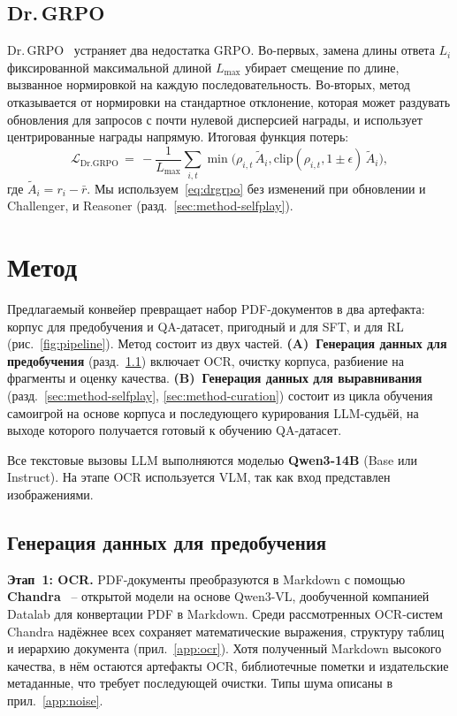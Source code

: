 \documentclass{article}
\begin{document}
\subsection{Dr.\,GRPO}

Dr.\,GRPO~\cite{liu2025drgrpo} устраняет два недостатка GRPO. Во-первых, замена длины ответа $L_i$ фиксированной максимальной длиной $L_{\max}$ убирает смещение по длине, вызванное нормировкой на каждую последовательность. Во-вторых, метод отказывается от нормировки на стандартное отклонение, которая может раздувать обновления для запросов с почти нулевой дисперсией награды, и использует центрированные награды напрямую. Итоговая функция потерь:
\begin{equation}
  \mathcal{L}_{\text{Dr.GRPO}} \,=\, -\frac{1}{L_{\max}}\!\sum_{i,t}
    \min\!\bigl(\rho_{i,t}\,\tilde A_i,
      \mathrm{clip}(\rho_{i,t}, 1\!\pm\!\epsilon)\,\tilde A_i\bigr),
  \label{eq:drgrpo}
\end{equation}
где $\tilde A_i = r_i - \bar r$. Мы используем~\eqref{eq:drgrpo} без изменений при обновлении и Challenger, и Reasoner (разд.~\ref{sec:method-selfplay}).

\section{Метод}\label{sec:method}

Предлагаемый конвейер превращает набор PDF-документов в два артефакта: корпус для предобучения и QA-датасет, пригодный и для SFT, и для RL (рис.~\ref{fig:pipeline}). Метод состоит из двух частей. \textbf{(A)~Генерация данных для предобучения} (разд.~\ref{sec:method-pretrain}) включает OCR, очистку корпуса, разбиение на фрагменты и оценку качества. \textbf{(B)~Генерация данных для выравнивания} (разд.~\ref{sec:method-selfplay}, \ref{sec:method-curation}) состоит из цикла обучения самоигрой на основе корпуса и последующего курирования LLM-судьёй, на выходе которого получается готовый к обучению QA-датасет.

Все текстовые вызовы LLM выполняются моделью \textbf{Qwen3-14B} (Base или Instruct). На этапе OCR используется VLM, так как вход представлен изображениями.

\subsection{Генерация данных для предобучения}\label{sec:method-pretrain}

\textbf{Этап~1: OCR.}\label{sec:corpus-ocr}
PDF-документы преобразуются в Markdown с помощью \textbf{Chandra}~\cite{chandra} -- открытой модели на основе Qwen3-VL, дообученной компанией Datalab для конвертации PDF в Markdown. Среди рассмотренных OCR-систем Chandra надёжнее всех сохраняет математические выражения, структуру таблиц и иерархию документа (прил.~\ref{app:ocr}). Хотя полученный Markdown высокого качества, в нём остаются артефакты OCR, библиотечные пометки и издательские метаданные, что требует последующей очистки. Типы шума описаны в прил.~\ref{app:noise}.
\end{document}
